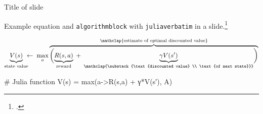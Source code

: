 \begin{frame}[fragile]{Title of slide}

Example equation and \texttt{algorithmblock} with \texttt{juliaverbatim} in a slide.\footcite{Kochenderfer2019}

\begin{equation*}
\underbrace{V(s)}_{\text{state value}} \!\!\! \leftarrow \;
\max\limits_a \overbrace{\biggl(
\underbrace{R(s,a)}_{\text{reward}} \; + \;
\underbrace{\gamma V(s^\prime)}_{\mathclap{\substack{\text{discounted value} \\ \text{of next state}}}}
\biggr)}^{\mathclap{\text{estimate of optimal discounted value}}}
\end{equation*}

\begin{algorithmblock}
\begin{juliaverbatim}
# Julia function
V(s) = max(a->R(s,a) + γ*V(s′), A)
\end{juliaverbatim}
\end{algorithmblock}

\end{frame}